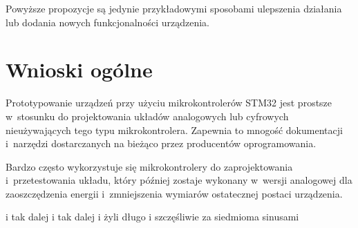Powyższe propozycje są jedynie przykładowymi sposobami ulepszenia działania lub dodania nowych funkcjonalności urządzenia.
\section{Wnioski ogólne}
Prototypowanie urządzeń przy użyciu mikrokontrolerów STM32 jest prostsze w~stosunku do projektowania układów analogowych lub cyfrowych nieużywających tego typu mikrokontrolera. Zapewnia to mnogość dokumentacji i~narzędzi dostarczanych na bieżąco przez producentów oprogramowania.

Bardzo często wykorzystuje się mikrokontrolery do zaprojektowania i~przetestowania układu, który później zostaje wykonany w~wersji analogowej dla zaoszczędzenia energii i~zmniejszenia wymiarów ostatecznej postaci urządzenia.


i tak dalej i tak dalej i żyli długo i szczęśliwie za siedmioma sinusami